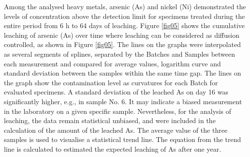 \documentclass[algorithms,article,accept,pdftex,moreauthors]{Definitions/mdpi}
\begin{document}
Among the analysed heavy metals, arsenic (As) and nickel (Ni) {demonstrated the levels of concentration} above the detection limit for {specimens treated during }the entire period from 6 h to 64 days of leaching. Figure \ref{fig05} shows the {cumulative} leaching of arsenic {(As) over} time {where} leaching can be considered as diffusion controlled{, as shown in }Figure \ref{fig05}. The lines on the graphs were interpolated as several segments of splines, separated by the Batches and Samples between each measurement and compared for average values, logarithm curve and standard deviation {between the samples within the same time gap}. The lines on the graph show the contamination level{ as }curvatures for each Batch for evaluated specimens. {A }standard deviation {of the leached As on} day 16 was significantly higher, e.g., in sample {No.} 6. It may indicate a biased measurement in the laboratory on a given specific sample. Nevertheless, for the analysis of leaching{, }the data remain statistical unbiased, and {were} included in the calculation of the amount of {the leached As}. The average value of the three samples is used to visualise a statistical trend line. The equation from the trend line is {calculated to estimated} the expected leaching of As after one year. 
\vspace{-2pt}
\end{document}
